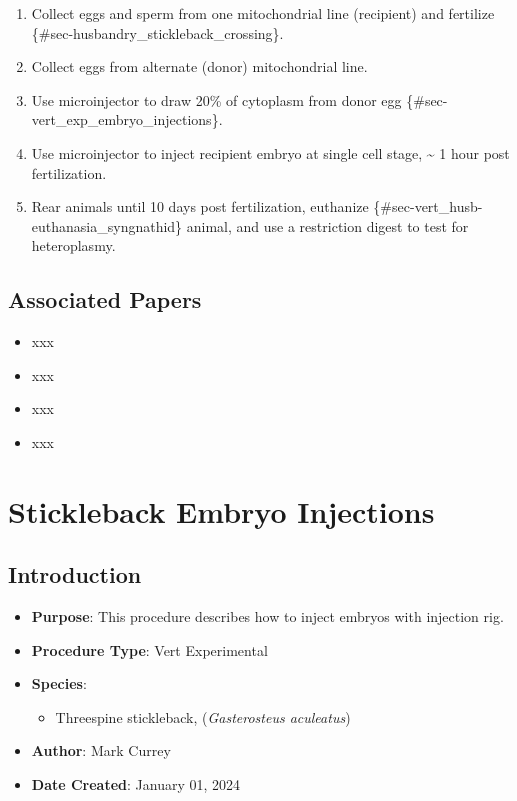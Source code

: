 \documentclass[
  letterpaper,
  DIV=11,
  numbers=noendperiod]{scrreprt}
\providecommand{\tightlist}{%
  \setlength{\itemsep}{0pt}\setlength{\parskip}{0pt}}\usepackage{longtable,booktabs,array}
\begin{document}
\begin{enumerate}
\def\labelenumi{\arabic{enumi}.}
\tightlist
\item
  Collect eggs and sperm from one mitochondrial line (recipient) and
  fertilize \{\#sec-husbandry\_stickleback\_crossing\}.
\item
  Collect eggs from alternate (donor) mitochondrial line.
\item
  Use microinjector to draw 20\% of cytoplasm from donor egg
  \{\#sec-vert\_exp\_embryo\_injections\}.
\item
  Use microinjector to inject recipient embryo at single cell stage,
  \textasciitilde{} 1 hour post fertilization.
\item
  Rear animals until 10 days post fertilization, euthanize
  \{\#sec-vert\_husb-euthanasia\_syngnathid\} animal, and use a
  restriction digest to test for heteroplasmy.
\end{enumerate}

\hypertarget{associated-papers-30}{%
\section{Associated Papers}\label{associated-papers-30}}

\begin{itemize}
\tightlist
\item
  xxx
\item
  xxx
\item
  xxx
\item
  xxx
\end{itemize}

\hypertarget{sec-vert_exp_embryo_injections}{%
\chapter{Stickleback Embryo
Injections}\label{sec-vert_exp_embryo_injections}}

\hypertarget{introduction-51}{%
\section{Introduction}\label{introduction-51}}

\begin{itemize}
\tightlist
\item
  \textbf{Purpose}: This procedure describes how to inject embryos with
  injection rig.
\item
  \textbf{Procedure Type}: Vert Experimental
\item
  \textbf{Species}:

  \begin{itemize}
  \tightlist
  \item
    Threespine stickleback, (\emph{Gasterosteus aculeatus})
  \end{itemize}
\item
  \textbf{Author}: Mark Currey\\
\item
  \textbf{Date Created}: January 01, 2024
\end{itemize}
\end{document}
